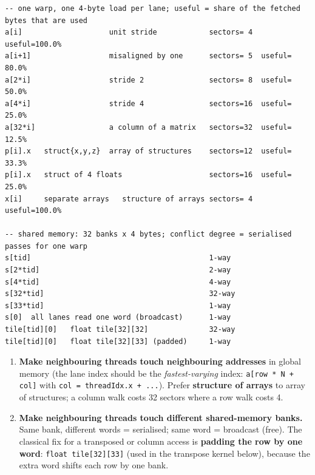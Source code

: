 \documentclass[10pt,a4paper,openany,oneside]{report}
\begin{document}
\begin{lstlisting}[style=out,basicstyle=\ttfamily\scriptsize,title={Captured output}]
-- one warp, one 4-byte load per lane; useful = share of the fetched bytes that are used
a[i]                    unit stride            sectors= 4  useful=100.0%
a[i+1]                  misaligned by one      sectors= 5  useful= 80.0%
a[2*i]                  stride 2               sectors= 8  useful= 50.0%
a[4*i]                  stride 4               sectors=16  useful= 25.0%
a[32*i]                 a column of a matrix   sectors=32  useful= 12.5%
p[i].x   struct{x,y,z}  array of structures    sectors=12  useful= 33.3%
p[i].x   struct of 4 floats                    sectors=16  useful= 25.0%
x[i]     separate arrays   structure of arrays sectors= 4  useful=100.0%

-- shared memory: 32 banks x 4 bytes; conflict degree = serialised passes for one warp
s[tid]                                         1-way
s[2*tid]                                       2-way
s[4*tid]                                       4-way
s[32*tid]                                      32-way
s[33*tid]                                      1-way
s[0]  all lanes read one word (broadcast)      1-way
tile[tid][0]   float tile[32][32]              32-way
tile[tid][0]   float tile[32][33] (padded)     1-way
\end{lstlisting}
\begin{mustbox}
\begin{enumerate}[nosep]
\item \textbf{Make neighbouring threads touch neighbouring addresses} in global memory (the lane index should be the \emph{fastest-varying} index: \texttt{a[row * N + col]} with \texttt{col = threadIdx.x + ...}). Prefer \textbf{structure of arrays} to array of structures; a column walk costs 32 sectors where a row walk costs 4.
\item \textbf{Make neighbouring threads touch different shared-memory banks.} Same bank, different words = serialised; same word = broadcast (free). The classical fix for a transposed or column access is \textbf{padding the row by one word}: \texttt{float tile[32][33]} (used in the transpose kernel below), because the extra word shifts each row by one bank.
\end{enumerate}
\end{mustbox}
\end{document}
